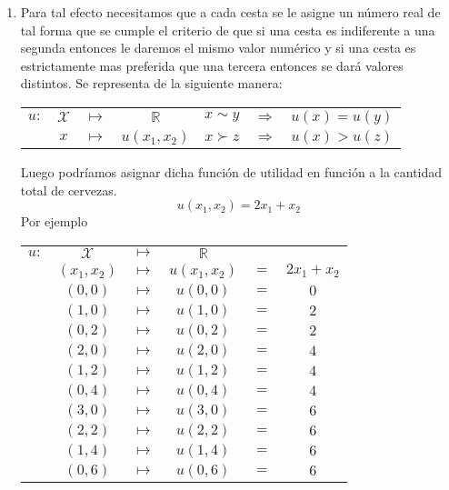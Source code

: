 \begin{enumerate}
	\begin{enumerate}[\bfseries (3.1)]
	    \item Para tal efecto necesitamos que a cada cesta se le asigne un número real de tal forma que se cumple el criterio de que si una cesta es indiferente a una segunda entonces le daremos el mismo valor numérico y si una cesta es estrictamente mas preferida que una tercera entonces se dará valores distintos. Se representa de la siguiente manera:     
		\begin{center}
		    \begin{tabular}{rccc|ccc}
			$u:$&$\mathcal{X}$ & $\longmapsto$ & $\mathbb{R}$ & $x \sim y$ & $\Rightarrow$ & $u(x)=u(y)$\\
			    & $x$ & $\longmapsto$ & $u(x_1,x_2)$ & $x\succ z$&$\Rightarrow$&$u(x)>u(z)$\\
		    \end{tabular}
		\end{center}
		\vspace{.3cm}
		Luego podríamos asignar dicha función de utilidad en función a la cantidad total de cervezas. 
		$$u(x_1,x_2)=2x_1+x_2$$
		Por ejemplo

		\begin{center}
		    \begin{tabular}{cccccc}
			$u:$&$\mathcal{X}$&$\longmapsto$&$\mathbb{R}$&&\\
			 & $(x_1,x_2)$ & $\longmapsto$&$u(x_1,x_2)$&$=$&$2x_1+x_2$\\
			    & $(0,0)$ & $\longmapsto$ & $u(0,0)$ & $=$ & $0$\\
			    & $(1,0)$ & $\longmapsto$ & $u(1,0)$ & $=$ & $2$\\
			    & $(0,2)$ & $\longmapsto$ & $u(0,2)$ & $=$ & $2$\\
			    & $(2,0)$ & $\longmapsto$ & $u(2,0)$ & $=$ & $4$\\
			    & $(1,2)$ & $\longmapsto$ & $u(1,2)$ & $=$ & $4$\\
			    & $(0,4)$ & $\longmapsto$ & $u(0,4)$ & $=$ & $4$\\
			    & $(3,0)$ & $\longmapsto$ & $u(3,0)$ & $=$ & $6$\\
			    & $(2,2)$ & $\longmapsto$ & $u(2,2)$ & $=$ & $6$\\
			    & $(1,4)$ & $\longmapsto$ & $u(1,4)$ & $=$ & $6$\\
			    & $(0,6)$ & $\longmapsto$ & $u(0,6)$ & $=$ & $6$\\
		    \end{tabular}
		\end{center} 
		\vspace{.5cm}


\end{enumerate}
\end{enumerate}

